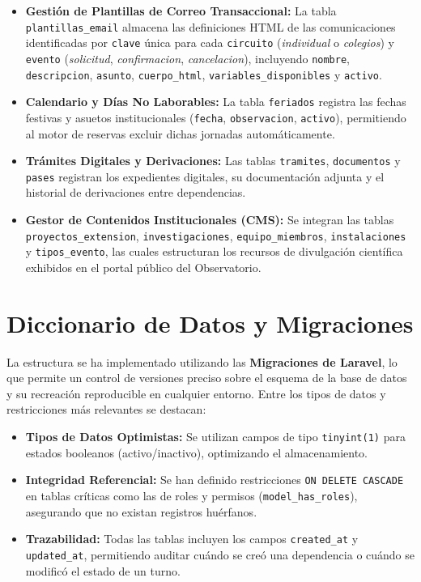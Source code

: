 \begin{itemize}
    \item \textbf{Gestión de Plantillas de Correo Transaccional:} La tabla \texttt{plantillas\_\allowbreak email} almacena las definiciones HTML de las comunicaciones identificadas por \texttt{clave} única para cada \texttt{circuito} (\textit{individual} o \textit{colegios}) y \texttt{evento} (\textit{solicitud}, \textit{confirmacion}, \textit{cancelacion}), incluyendo \texttt{nombre}, \texttt{descripcion}, \texttt{asunto}, \texttt{cuerpo\_\allowbreak html}, \texttt{variables\_\allowbreak disponibles} y \texttt{activo}.
    \item \textbf{Calendario y Días No Laborables:} La tabla \texttt{feriados} registra las fechas festivas y asuetos institucionales (\texttt{fecha}, \texttt{observacion}, \texttt{activo}), permitiendo al motor de reservas excluir dichas jornadas automáticamente.
    \item \textbf{Trámites Digitales y Derivaciones:} Las tablas \texttt{tramites}, \texttt{documentos} y \texttt{pases} registran los expedientes digitales, su documentación adjunta y el historial de derivaciones entre dependencias.
    \item \textbf{Gestor de Contenidos Institucionales (CMS):} Se integran las tablas \texttt{proyectos\_\allowbreak extension}, \texttt{in\-ves\-ti\-ga\-cio\-nes}, \texttt{equipo\_\allowbreak miembros}, \texttt{ins\-ta\-la\-cio\-nes} y \texttt{tipos\_\allowbreak evento}, las cuales estructuran los recursos de divulgación científica exhibidos en el portal público del Observatorio.
\end{itemize}

\section{Diccionario de Datos y Migraciones}
La estructura se ha implementado utilizando las \textbf{Migraciones de Laravel}, lo que permite un control de versiones preciso sobre el esquema de la base de datos y su recreación reproducible en cualquier entorno. Entre los tipos de datos y restricciones más relevantes se destacan:

\begin{itemize}
    \item \textbf{Tipos de Datos Optimistas:} Se utilizan campos de tipo \texttt{tinyint(1)} para estados booleanos (activo/inactivo), optimizando el almacenamiento.
    \item \textbf{Integridad Referencial:} Se han definido restricciones \texttt{ON DELETE CASCADE} en tablas críticas como las de roles y permisos (\texttt{model\_has\_roles}), asegurando que no existan registros huérfanos.
    \item \textbf{Trazabilidad:} Todas las tablas incluyen los campos \texttt{created\_at} y \texttt{updated\_at}, permitiendo auditar cuándo se creó una dependencia o cuándo se modificó el estado de un turno.
\end{itemize}


